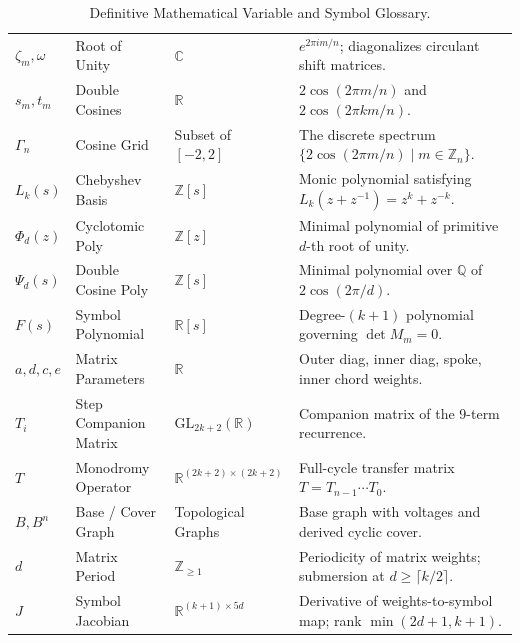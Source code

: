 \documentclass[11pt]{article}
\begin{document}
\begin{table}[htbp]
\begin{tabular}{@{}llp{2.6cm}p{6.6cm}@{}}
$\zeta_m, \omega$ & Root of Unity & $\mathbb{C}$ & $e^{2\pi i m / n}$; diagonalizes circulant shift matrices. \\
$s_m, t_m$ & Double Cosines & $\mathbb{R}$ & $2\cos(2\pi m / n)$ and $2\cos(2\pi km / n)$. \\
$\Gamma_n$ & Cosine Grid & Subset of $[-2, 2]$ & The discrete spectrum $\{2\cos(2\pi m/n) \mid m \in \mathbb{Z}_n\}$. \\
$L_k(s)$ & Chebyshev Basis & $\mathbb{Z}[s]$ & Monic polynomial satisfying $L_k(z+z^{-1}) = z^k + z^{-k}$. \\
$\Phi_d(z)$ & Cyclotomic Poly & $\mathbb{Z}[z]$ & Minimal polynomial of primitive $d$-th root of unity. \\
$\Psi_d(s)$ & Double Cosine Poly & $\mathbb{Z}[s]$ & Minimal polynomial over $\mathbb{Q}$ of $2\cos(2\pi/d)$. \\
$F(s)$ & Symbol Polynomial & $\mathbb{R}[s]$ & Degree-$(k+1)$ polynomial governing $\det M_m = 0$. \\
$a, d, c, e$ & Matrix Parameters & $\mathbb{R}$ & Outer diag, inner diag, spoke, inner chord weights. \\
$T_i$ & Step Companion Matrix & $\mathrm{GL}_{2k+2}(\mathbb{R})$ & Companion matrix of the 9-term recurrence. \\
$T$ & Monodromy Operator & $\mathbb{R}^{(2k+2) \times (2k+2)}$ & Full-cycle transfer matrix $T = T_{n-1} \cdots T_0$. \\
$B, B^n$ & Base / Cover Graph & Topological Graphs & Base graph with voltages and derived cyclic cover. \\
$d$ & Matrix Period & $\mathbb{Z}_{\ge 1}$ & Periodicity of matrix weights; submersion at $d \ge \lceil k/2 \rceil$. \\
$J$ & Symbol Jacobian & $\mathbb{R}^{(k+1) \times 5d}$ & Derivative of weights-to-symbol map; rank $\min(2d+1, k+1)$. \\
\bottomrule
\end{tabular}
\caption{Definitive Mathematical Variable and Symbol Glossary.}
\label{tab:variables}
\end{table}

\newpage

\end{document}
